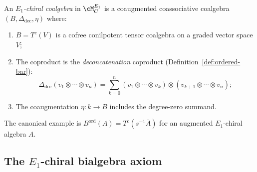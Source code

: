 \begin{definition}
\label{def:e1-chiral-coalgebra}
An \emph{$E_1$-chiral coalgebra} in $\cM^{E_1}_C$ is a coaugmented
coassociative coalgebra $(B, \Delta_{\mathrm{dec}}, \eta)$ where:
\begin{enumerate}[label=(\roman*)]
 \item $B = T^c(V)$ is a cofree conilpotent tensor coalgebra on a graded
 vector space $V$;
 \item The coproduct is the \emph{deconcatenation} coproduct
 (Definition~\ref{def:ordered-bar}):
 \[
 \Delta_{\mathrm{dec}}(v_1 \otimes \cdots \otimes v_n)
 = \sum_{k=0}^{n} (v_1 \otimes \cdots \otimes v_k)
 \otimes (v_{k+1} \otimes \cdots \otimes v_n);
 \]
 \item The coaugmentation $\eta \colon k \to B$ includes the
 degree-zero summand.
\end{enumerate}
The canonical example is $B^{\mathrm{ord}}(A) = T^c(s^{-1}\bar{A})$
for an augmented $E_1$-chiral algebra $A$.
\end{definition}

\subsection{The \texorpdfstring{$E_1$}{E-1}-chiral bialgebra axiom}
\label{subsec:e1-bialgebra-axiom}

